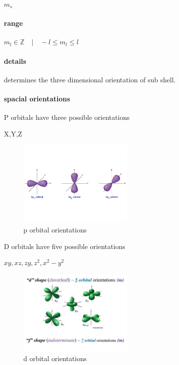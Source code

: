 \documentclass[]{article}
\let\oldparagraph\paragraph
\renewcommand{\paragraph}[1]{\oldparagraph{#1}\mbox{}}
\begin{document}
\(m_s\)

\hypertarget{range-2}{%
\paragraph{range}\label{range-2}}

\(m_{l} \in \mathbb{Z} \quad | \quad -l \leq m_{l} \leq l\quad\)

\hypertarget{details-2}{%
\paragraph{details}\label{details-2}}

determines the three dimensional orientation of sub shell.

\hypertarget{spacial-orientations}{%
\paragraph{spacial orientations}\label{spacial-orientations}}

P orbitals have three possible orientations

X,Y,Z

\begin{figure}
\centering
\includegraphics[width=0.5\textwidth,height=\textheight]{Images/dOrbitalOrientation.jpg}
\caption{p orbital orientations}
\end{figure}

D orbitals have five possible orientations

\(xy,xz,zy,z^{2},x^{2}-y^{2}\)

\begin{figure}
\centering
\includegraphics[width=0.5\textwidth,height=\textheight]{Images/dOrbitalOrientations.jpg}
\caption{d orbital orientations}
\end{figure}
\end{document}

